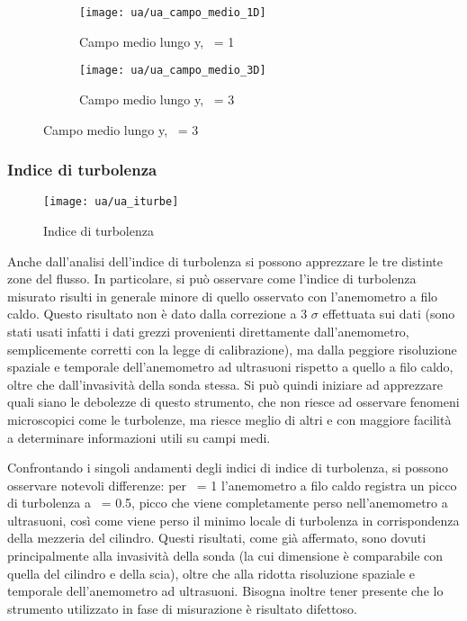 \documentclass{article} %
\newcommand{\xd}{\nicefrac{\textrm{x}}{\textrm{D}}\ }
\newcommand{\yd}{\nicefrac{\textrm{y}}{\textrm{D}}\ }
\begin{document}
\begin{figure}[hb!]
	\centering
	\begin{subfigure}{0.4\textwidth}
		\texttt{[image: ua/ua\_campo\_medio\_1D]}
		\caption{Campo medio lungo y, \xd = 1}
		\label{ua_campo_medio_1D}
	\end{subfigure}\qquad
	\begin{subfigure}{0.4\textwidth}
		\texttt{[image: ua/ua\_campo\_medio\_3D]}
		\caption{Campo medio lungo y, \xd = 3}
		\label{ua_campo_medio_3D}
	\end{subfigure}
\end{figure}
\newpage
\subsubsection{Indice di turbolenza}
\begin{figure}[h!]
	\centering
	\texttt{[image: ua/ua\_iturbe]}
	\label{ua_iturbe}
	\caption{Indice di turbolenza}
\end{figure}
Anche dall'analisi dell'indice di turbolenza si possono apprezzare le tre distinte zone del flusso. In particolare, si può osservare come l'indice di turbolenza misurato risulti in generale minore di quello osservato con l'anemometro a filo caldo. Questo risultato non è dato dalla correzione a 3 $\sigma$ effettuata sui dati (sono stati usati infatti i dati grezzi provenienti direttamente dall'anemometro, semplicemente corretti con la legge di calibrazione), ma dalla peggiore risoluzione spaziale e temporale dell'anemometro ad ultrasuoni rispetto a quello a filo caldo, oltre che dall'invasività della sonda stessa. Si può quindi iniziare ad apprezzare quali siano le debolezze di questo strumento, che non riesce ad osservare fenomeni microscopici come le turbolenze, ma riesce meglio di altri e con maggiore facilità a determinare informazioni utili su campi medi.\par
Confrontando i singoli andamenti degli indici di indice di turbolenza, si possono osservare notevoli differenze: per \xd = 1 l'anemometro a filo caldo registra un picco di turbolenza a \yd = 0.5, picco che viene completamente perso nell'anemometro a ultrasuoni, così come viene perso il minimo locale di turbolenza in corrispondenza della mezzeria del cilindro. Questi risultati, come già affermato, sono dovuti principalmente alla invasività della sonda (la cui dimensione è comparabile con quella del cilindro e della scia), oltre che alla ridotta risoluzione spaziale e temporale dell'anemometro ad ultrasuoni. Bisogna inoltre tener presente che lo strumento utilizzato in fase di misurazione è risultato difettoso.\par
\end{document}
